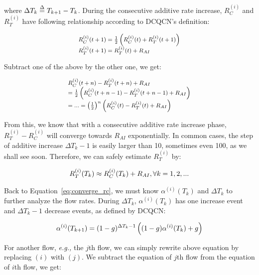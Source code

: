 where $\Delta {T_k} \buildrel \Delta \over = {T_{k + 1}} - {T_k}$. During the consecutive 
additive rate increase, $R_C^{(i)}$ and $R_T^{(i)}$ have following relationship according 
to DCQCN's definition:

\begin{equation}
\small
\begin{array}{l}
R_C^{(i)}(t + 1) = \frac{1}{2}\left( {R_C^{(i)}(t) + R_T^{(i)}(t + 1)} \right)\\
R_T^{(i)}(t + 1) = R_T^{(i)}(t) + {R_{AI}}
\end{array}
\end{equation}

Subtract one of the above by the other one, we get:

\begin{equation}
\small
\begin{array}{l}
R_C^{(i)}(t + n) - R_T^{(i)}(t + n) + {R_{AI}}\\
 = \frac{1}{2}\left( {R_C^{(i)}(t + n - 1) - R_T^{(i)}(t + n - 1) + {R_{AI}}} \right)\\
 = ... = {\left( {\frac{1}{2}} \right)^n}\left( {R_C^{(i)}(t) - R_T^{(i)}(t) + {R_{AI}}} \right)
\end{array}
\end{equation}

From this, we know that with a consecutive additive rate increase phase, $R_T^{(i)} - R_C^{(i)}$
will converge towards $R_{AI}$ exponentially. In common cases, the step of additive increase
$\Delta {T_k} - 1$ is easily larger than 10, sometimes even 100, as we shall see soon. Therefore,
we can safely estimate $R_T^{(i)}$ by:

\begin{equation}
\small
R_T^{(i)}({T_k}) \approx R_C^{(i)}({T_k}) + {R_{AI}},\forall k = 1,2,...
\end{equation}

Back to Equation~\ref{eq:converge_rc}, we must know $\alpha ^{(i)}({T_k})$ and $\Delta T_k$ to 
further analyze the flow rates. During $\Delta T_k$, $\alpha ^{(i)}({T_k})$ has one increase event
and $\Delta T_k - 1$ decrease events, as defined by DCQCN:

\begin{equation}
\small
{\alpha ^{(i)}}({T_{k + 1}}) = {(1 - g)^{\Delta {T_k} - 1}}\left( {(1 - g){\alpha ^{(i)}}({T_k}) + g} \right)
\label{eq:converge_alpha}
\end{equation}

For another flow, {\em e.g.,} the $j$th flow, we can simply rewrite above equation by replacing 
$(i)$ with $(j)$. We subtract the equation of $j$th flow from the equation of $i$th flow, we get:

